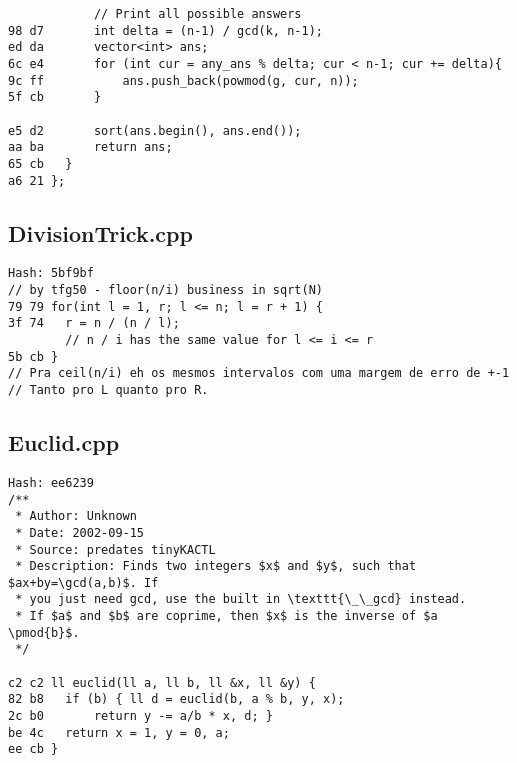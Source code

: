 \documentclass[11pt, a4paper, twoside]{article}
\begin{document}
\begin{lstlisting}
      	    // Print all possible answers
98 d7 	    int delta = (n-1) / gcd(k, n-1);
ed da 	    vector<int> ans;
6c e4 	    for (int cur = any_ans % delta; cur < n-1; cur += delta){
9c ff 	        ans.push_back(powmod(g, cur, n));
5f cb 	    }
      
e5 d2 	    sort(ans.begin(), ans.end());
aa ba 	    return ans;
65 cb 	}
a6 21 };
\end{lstlisting}

\subsection{DivisionTrick.cpp}
\begin{lstlisting}
Hash: 5bf9bf
// by tfg50 - floor(n/i) business in sqrt(N)
79 79 for(int l = 1, r; l <= n; l = r + 1) {
3f 74 	r = n / (n / l);
      	// n / i has the same value for l <= i <= r
5b cb }
// Pra ceil(n/i) eh os mesmos intervalos com uma margem de erro de +-1
// Tanto pro L quanto pro R.
\end{lstlisting}

\subsection{Euclid.cpp}
\begin{lstlisting}
Hash: ee6239
/**
 * Author: Unknown
 * Date: 2002-09-15
 * Source: predates tinyKACTL
 * Description: Finds two integers $x$ and $y$, such that $ax+by=\gcd(a,b)$. If
 * you just need gcd, use the built in \texttt{\_\_gcd} instead.
 * If $a$ and $b$ are coprime, then $x$ is the inverse of $a \pmod{b}$.
 */

c2 c2 ll euclid(ll a, ll b, ll &x, ll &y) {
82 b8 	if (b) { ll d = euclid(b, a % b, y, x);
2c b0 		return y -= a/b * x, d; }
be 4c 	return x = 1, y = 0, a;
ee cb }
\end{lstlisting}
\end{document}
